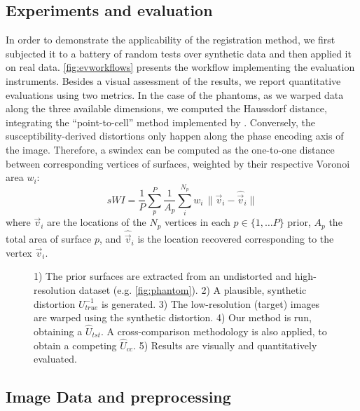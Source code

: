 \subsection*{Experiments and evaluation}
\label{sec:experiments_evaluation}
%
In order to demonstrate the applicability of the registration method, we first
  subjected it to a battery of random tests over synthetic data and then applied
  it on real data.
\autoref{fig:evworkflows} presents the workflow implementing the evaluation instruments.
Besides a visual assessment of the results, we report quantitative evaluations using
  two metrics.
In the case of the phantoms, as we warped data along the three available dimensions,
  we computed the Haussdorf distance, integrating the ``point-to-cell'' method
	implemented by \cite{commandeur_vtk_2011}.
Conversely, the susceptibility-derived distortions only happen along the phase
  encoding axis of the image.
Therefore, a \gls*{swindex} can be computed as the one-to-one distance between corresponding
  vertices of surfaces, weighted by their respective Voronoi area $w_i$:
  \begin{equation}
  sWI = \frac{1}{P} \sum\limits_p^P \frac{1}{A_p} \sum\limits_i^{N_p} w_i\,\|
  \vec{v}_i - \hat{\vec{v}}_i \|
  \end{equation}
  where $\vec{v}_i$ are the locations of the $N_p$ vertices in each $p \in \{1, \dots P\}$
  prior, $A_p$ the total area of surface $p$, and $\hat{\vec{v}}_i$ is the location
  recovered corresponding to the vertex $\vec{v}_i$.


\begin{figure}
\caption{1) The prior surfaces are extracted from an undistorted and high-resolution dataset
	  (e.g. \autoref{fig:phantom}). 2) A plausible, synthetic distortion $U^{-1}_{true}$ is generated.
	3) The low-resolution (target) images are warped using the synthetic distortion.
	4) Our method is run, obtaining a $\hat{U}_{tst}$.
	  A cross-comparison methodology is also applied, to obtain a competing $\hat{U}_{cc}$.
	5) Results are visually and quantitatively evaluated.}\label{fig:evworkflows}
\end{figure}

\subsection*{Image Data and preprocessing}
\label{sec:datasets}

